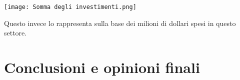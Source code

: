 \documentclass{article}
\begin{document}
\begin{center}
    \texttt{[image: Somma degli investimenti.png]}
\end{center}
\begin{justify}
    Questo invece lo rappresenta sulla base dei milioni di dollari spesi in questo settore.
\end{justify}

\newpage \centering
\section{Conclusioni e opinioni finali}
\begin{justify}
   
\end{justify}

\begin{justify}
    
    
\end{justify}
\end{document}
